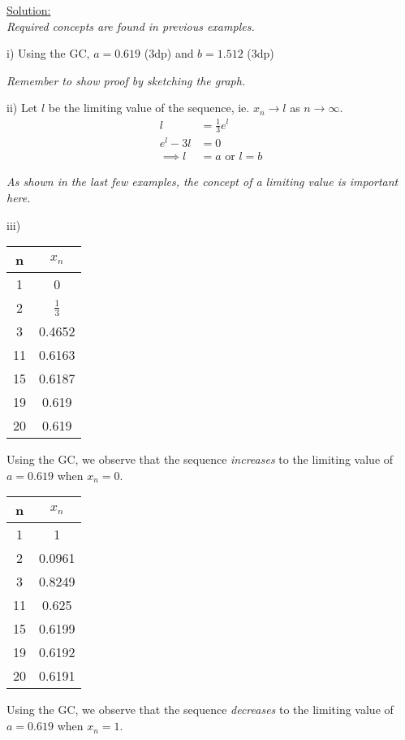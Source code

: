 \documentclass[12pt, a4paper, titlepage]{article}
\begin{document}
\begin{flushright}
\end{flushright}

\underline{Solution:} \\
\emph{Required concepts are found in previous examples.}

i)
Using the GC, $a = 0.619$ (3dp) and $b = 1.512$ (3dp)

\emph{Remember to show proof by sketching the graph.}

ii)
Let $l$ be the limiting value of the sequence, ie. $x_n \rightarrow l$ as $n \rightarrow \infty$.
\begin{align*}
    l &= \frac{1}{3}e^l \\
    e^l - 3l &= 0 \\
    \implies l &= a \text{ or } l = b
\end{align*}

\emph{As shown in the last few examples, the concept of a limiting value is important here.}

iii) \\
\begin{minipage}{0.3\textwidth}
    \begin{tabular}{c|c}
        n & $x_n$ \\
        \hline
        1 & 0 \\
        \hline
        2 & $\frac{1}{3}$ \\
        \hline
        3 & 0.4652 \\
        \hline
        11 & 0.6163 \\
        \hline
        15 & 0.6187 \\
        \hline
        19 & 0.619 \\
        \hline
        20 & 0.619
    \end{tabular}
\end{minipage}
\begin{minipage}{0.6\textwidth}
    Using the GC, we observe that the sequence \emph{increases} to the limiting value of $a = 0.619$ when $x_n = 0$.
\end{minipage}

\begin{minipage}{0.3\textwidth}
    \begin{tabular}{c|c}
        n & $x_n$ \\
        \hline
        1 & 1 \\
        \hline
        2 & 0.0961 \\
        \hline
        3 & 0.8249 \\
        \hline
        11 & 0.625 \\
        \hline
        15 & 0.6199 \\
        \hline
        19 & 0.6192 \\
        \hline
        20 & 0.6191
    \end{tabular}
\end{minipage}
\begin{minipage}{0.6\textwidth}
    Using the GC, we observe that the sequence \emph{decreases} to the limiting value of $a = 0.619$ when $x_n = 1$.
\end{minipage}
\end{document}
